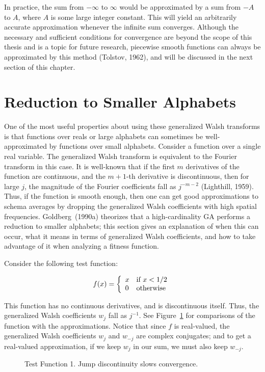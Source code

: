 In practice, the sum from $-\infty$ to $\infty$ would be approximated
by a sum from $-A$ to $A$, where $A$ is some large integer constant.
This will yield an arbitrarily accurate approximation whenever the
infinite sum converges.  Although the necessary and sufficient conditions for
convergence are beyond the scope of this thesis and is a topic for
future research, piecewise smooth functions can always be approximated
by this method (Tolstov, 1962), and will be discussed in the next section of
this chapter.

\section{Reduction to Smaller Alphabets}
One of the most useful properties about using these generalized Walsh
transforms is that functions over reals or large alphabets can sometimes
be well-approximated by functions over small alphabets.  
Consider a function over a single real variable.  The generalized
Walsh transform is equivalent to the Fourier transform in this case.
It is well-known that
if the first $m$ derivatives of the function are continuous, and the $m+1$-th
derivative is discontinuous, then for large
$j$, the magnitude of the Fourier coefficients fall as $j^{-m-2}$
(Lighthill, 1959).
Thus, if the function is smooth enough, then one can get good approximations
to schema averages by dropping the generalized Walsh coefficients with
high spatial frequencies.  Goldberg~(1990a) theorizes that a high-cardinality
GA performs a reduction to smaller alphabets; this section gives an
explanation of when this can occur, what it means in terms of
generalized Walsh coefficients, and how to take advantage of it when analyzing
a fitness function.

\begin{example}
Consider the following test function:
\begin{definition}
\begin{equation}
f(x)= \left\{ \begin{array}{ll}
	x & \mbox{\rm if $x<1/2$} \\
	0 & \mbox{\rm otherwise}
	\end{array}
	\right.
\end{equation}
\end{definition}
This function has no continuous derivatives, and is discontinuous itself.
Thus, the generalized Walsh coefficients $w_j$ fall as $j^{-1}$.  See Figure~\ref{testfn1}
 for comparisons of the function with the approximations.
Notice that since $f$ is real-valued, the generalized Walsh coefficients $w_j$ and
$w_{-j}$ are complex conjugates; and to get a real-valued approximation,
if we keep $w_j$ in our sum, we must also keep $w_{-j}$.
\begin{figure}
\caption{Test Function 1.  Jump discontinuity slows convergence.}
\label{testfn1}
\end{figure}
\end{example}

